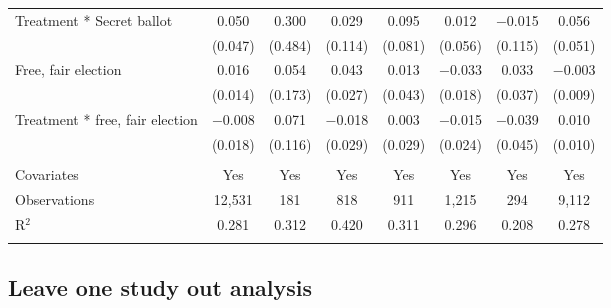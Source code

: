 \documentclass[]{article}
\begin{document}
\begin{table}[!htbp]
\begin{tabular}{@{\extracolsep{1pt}}lccccccc}
  Treatment * Secret ballot & 0.050 & 0.300 & 0.029 & 0.095 & 0.012 & $-$0.015 & 0.056 \\ 
  & (0.047) & (0.484) & (0.114) & (0.081) & (0.056) & (0.115) & (0.051) \\ 
  Free, fair election & 0.016 & 0.054 & 0.043 & 0.013 & $-$0.033 & 0.033 & $-$0.003 \\ 
  & (0.014) & (0.173) & (0.027) & (0.043) & (0.018) & (0.037) & (0.009) \\ 
  Treatment * free, fair election & $-$0.008 & 0.071 & $-$0.018 & 0.003 & $-$0.015 & $-$0.039 & 0.010 \\ 
  & (0.018) & (0.116) & (0.029) & (0.029) & (0.024) & (0.045) & (0.010) \\ 
 \hline \\[-1.8ex] 
Covariates & Yes & Yes & Yes & Yes & Yes & Yes & Yes \\ 
Observations & 12,531 & 181 & 818 & 911 & 1,215 & 294 & 9,112 \\ 
R$^{2}$ & 0.281 & 0.312 & 0.420 & 0.311 & 0.296 & 0.208 & 0.278 \\ 
\hline 
\hline \\[-1.8ex] 
\end{tabular} 
\end{table}

\clearpage

\subsection{Leave one study out
analysis}\label{leave-one-study-out-analysis}
\end{document}
